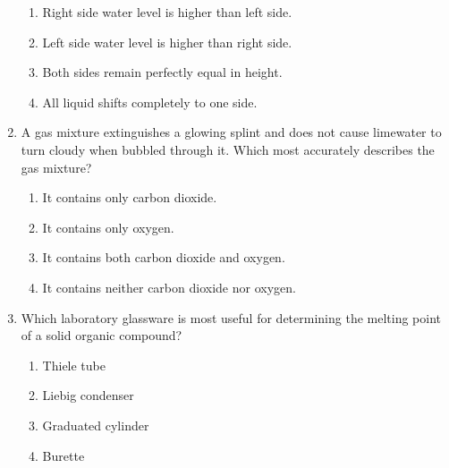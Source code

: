 \documentclass[10pt,letterpaper]{article}
\begin{document}
\begin{multicols*}{2}
\begin{enumerate}
    \begin{center}
    \end{center}
    \begin{enumerate}[label=(\textsubscript{\Alph*})]
        \item Right side water level is higher than left side.
        \item Left side water level is higher than right side.
        \item Both sides remain perfectly equal in height.
        \item All liquid shifts completely to one side.
    \end{enumerate}

    \item A gas mixture extinguishes a glowing splint and does not cause limewater to turn cloudy when bubbled through it. Which most accurately describes the gas mixture?
    \begin{enumerate}[label=(\textsubscript{\Alph*})]
        \item It contains only carbon dioxide.
        \item It contains only oxygen.
        \item It contains both carbon dioxide and oxygen.
        \item It contains neither carbon dioxide nor oxygen.
    \end{enumerate}

    \item Which laboratory glassware is most useful for determining the melting point of a solid organic compound?
    \begin{enumerate}[label=(\textsubscript{\Alph*})]
        \item Thiele tube
        \item Liebig condenser
        \item Graduated cylinder
        \item Burette
    \end{enumerate}


\end{enumerate}
\end{multicols*}
\end{document}

